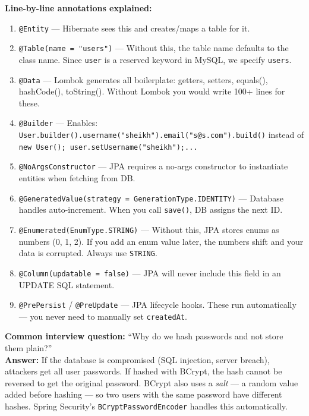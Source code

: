 \documentclass[12pt,a4paper]{report}
\newcommand{\code}[1]{\texttt{\textcolor{keywordblue}{#1}}}
\begin{document}
\textbf{Line-by-line annotations explained:}

\begin{enumerate}
  \item \code{@Entity} --- Hibernate sees this and creates/maps a table for it.
  \item \code{@Table(name = "users")} --- Without this, the table name defaults to the class name. Since \code{user} is a reserved keyword in MySQL, we specify \code{users}.
  \item \code{@Data} --- Lombok generates all boilerplate: getters, setters, equals(), hashCode(), toString(). Without Lombok you would write 100+ lines for these.
  \item \code{@Builder} --- Enables: \code{User.builder().username("sheikh").email("s@s.com").build()} instead of \code{new User(); user.setUsername("sheikh");...}
  \item \code{@NoArgsConstructor} --- JPA requires a no-args constructor to instantiate entities when fetching from DB.
  \item \code{@GeneratedValue(strategy = GenerationType.IDENTITY)} --- Database handles auto-increment. When you call \code{save()}, DB assigns the next ID.
  \item \code{@Enumerated(EnumType.STRING)} --- Without this, JPA stores enums as numbers (0, 1, 2). If you add an enum value later, the numbers shift and your data is corrupted. Always use \code{STRING}.
  \item \code{@Column(updatable = false)} --- JPA will never include this field in an UPDATE SQL statement.
  \item \code{@PrePersist} / \code{@PreUpdate} --- JPA lifecycle hooks. These run automatically --- you never need to manually set \code{createdAt}.
\end{enumerate}

\begin{tcolorbox}[interviewbox]
\textbf{Common interview question:} ``Why do we hash passwords and not store them plain?''\\[6pt]
\textbf{Answer:} If the database is compromised (SQL injection, server breach), attackers get all user passwords. If hashed with BCrypt, the hash cannot be reversed to get the original password. BCrypt also uses a \textit{salt} --- a random value added before hashing --- so two users with the same password have different hashes. Spring Security's \code{BCryptPasswordEncoder} handles this automatically.
\end{tcolorbox}
\end{document}
